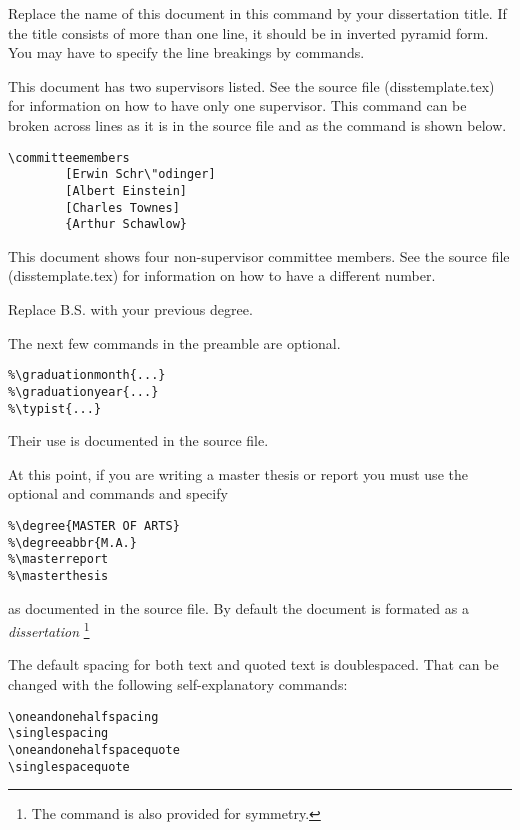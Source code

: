 %
Replace the name of this document
in this command by your dissertation title. If the title consists of more
than one line, it should be in inverted pyramid form. You may have to specify
the line breakings by \texttt{\bslash\bslash} commands.

%
This document has two supervisors listed. See the source file
(disstemplate.tex) for information on how to have only one supervisor.
This command can be broken across lines as it is in the source file and
as the  command is shown below.

\begin{verbatim}
\committeemembers
        [Erwin Schr\"odinger]
        [Albert Einstein]
        [Charles Townes]
        {Arthur Schawlow}
\end{verbatim}
%
This document shows four non-supervisor committee members. See the source
file (disstemplate.tex) for information on how to have a different number.

 Replace B.S. with your previous degree.

The next few commands in the preamble are optional.
\begin{verbatim}
%\graduationmonth{...}
%\graduationyear{...}
%\typist{...}
\end{verbatim}
Their use is documented in the source file.

At this point, if you are writing a master thesis or report
you must use the optional  and  commands
and specify
\begin{verbatim}
%\degree{MASTER OF ARTS}
%\degreeabbr{M.A.}
%\masterreport
%\masterthesis
\end{verbatim}
as documented in the source file. By default the document is formated
as a \emph{dissertation}%
\footnote{The command  is also provided for symmetry.}%


The default spacing for both text and quoted text is doublespaced.
That can be changed with the following self-explanatory commands: 
\begin{verbatim}
\oneandonehalfspacing 
\singlespacing
\oneandonehalfspacequote
\singlespacequote
\end{verbatim}
%
%
%
%

